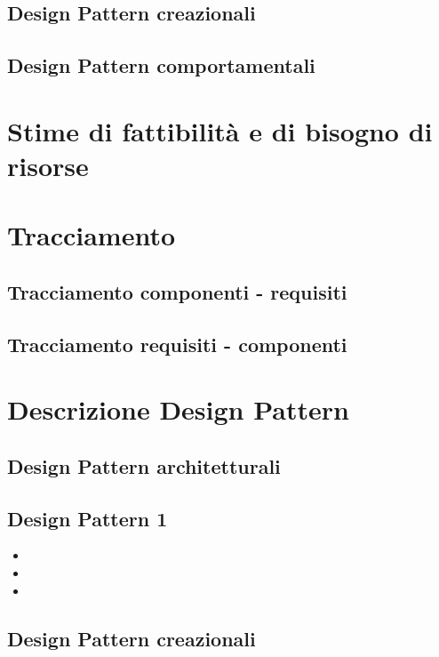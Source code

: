 \subsection{Design Pattern creazionali} %
\subsection{Design Pattern comportamentali} %

\newpage
\section{Stime di fattibilità e di bisogno di risorse}%

\newpage
\section{Tracciamento} %
\subsection{Tracciamento componenti - requisiti} %
\subsection{Tracciamento requisiti - componenti} %

\newpage
\appendix
\section{Descrizione Design Pattern} %

\subsection{Design Pattern architetturali} %
\subsection{Design Pattern 1} %
\begin{itemize}
\item {} 
\item {} 
\item {}
\end{itemize}

\subsection{Design Pattern creazionali} %
